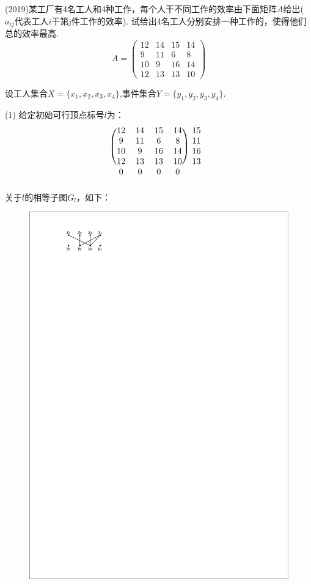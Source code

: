 \begin{example}
	(2019)某工厂有4名工人和4种工作，每个人干不同工作的效率由下面矩阵$A$给出($a_{ij}$代表工人$i$干第j件工作的效率). 试给出4名工人分别安排一种工作的，使得他们总的效率最高.
	\[

	A=\begin{pmatrix}
		12&14&15&14\\
		9&11&6&8\\
		10&9&16&14\\
		12&13&13&10
	\end{pmatrix}
	\]
	
	\noindent {\bfseries\songti \textcolor{ecolor}{解：}}设工人集合$X=\{x_1, x_2, x_3, x_4\}$,事件集合$Y=\{y_1, y_2, y_3, y_4\}$.
	
\noindent(1) 给定初始可行顶点标号$l$为：
	\[
	\begin{blockarray}{ccccc}
		\begin{block}{(cccc)c}
			12&14&15&14&15\\
			9&11&6&8&11\\
			10&9&16&14&16\\
			12&13&13&10&13\\
		\end{block}
		0&0&0&0&
	\end{blockarray}
	\]
	关于$l$的相等子图$G_l$，如下：
	\begin{figure}[H]
		\small
		\centering 
		\includegraphics[scale=1.2]{image/CH5_zuiyoupipei1.pdf}  
		\label{fikgkjjjl1KKk}  
	\end{figure}


\end{example}
